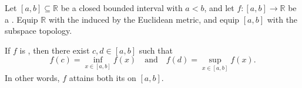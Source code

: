 \begin{theorem} \label{theorem:extreme_value_theorem_for_continuous_functions_on_closed_bounded_intervals}
    Let $[a, b] \subseteq \mathbb{R}$ be a closed bounded interval with $a < b$, and let $f : [a, b] \to \mathbb{R}$ be a . Equip $\mathbb{R}$ with the  induced by the Euclidean metric, and equip $[a, b]$ with the subspace topology.

    If $f$ is , then there exist $c, d \in [a, b]$ such that
    $$f(c) = \inf_{x \in [a,b]} f(x) \quad \text{and} \quad f(d) = \sup_{x \in [a,b]} f(x).$$
    In other words, $f$ attains both its  on $[a, b]$.
\end{theorem}

